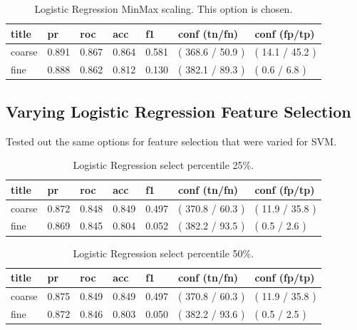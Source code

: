 \documentclass[ms]{nuthesis}
\begin{document}
\FloatBarrier
\begin{table}[H]
\centering
\caption{Logistic Regression MinMax scaling. This option is chosen.}
\label{tab:LogRegMinMax}
\begin{tabular}{|l||l||l||l||l||l||l|}\toprule
title & pr & roc & acc & f1 & conf (tn/fn) & conf (fp/tp) \\ \midrule
coarse & 0.891 & 0.867 & 0.864 & 0.581 & ( 368.6 / 50.9 ) & ( 14.1 / 45.2 ) \\
fine & 0.888 & 0.862 & 0.812 & 0.130 & ( 382.1 / 89.3 ) & ( 0.6 / 6.8 ) \\ \bottomrule
\end{tabular}
\end{table}
\FloatBarrier


\subsection{Varying Logistic Regression Feature Selection}
\par Tested out the same options for feature selection that were varied for SVM.

\FloatBarrier
\begin{table}[H]
\centering
\caption{Logistic Regression select percentile 25\%.}
\label{tab:LogRegSel25}
\begin{tabular}{|l||l||l||l||l||l||l|}\toprule
title & pr & roc & acc & f1 & conf (tn/fn) & conf (fp/tp) \\ \midrule
coarse & 0.872 & 0.848 & 0.849 & 0.497 & ( 370.8 / 60.3 ) & ( 11.9 / 35.8 ) \\
fine & 0.869 & 0.845 & 0.804 & 0.052 & ( 382.2 / 93.5 ) & ( 0.5 / 2.6 ) \\ \bottomrule
\end{tabular}
\end{table}
\FloatBarrier


\FloatBarrier
\begin{table}[H]
\centering
\caption{Logistic Regression select percentile 50\%.}
\label{tab:LogRegSel50}
\begin{tabular}{|l||l||l||l||l||l||l|}\toprule
title & pr & roc & acc & f1 & conf (tn/fn) & conf (fp/tp) \\ \midrule
coarse & 0.875 & 0.849 & 0.849 & 0.497 & ( 370.8 / 60.3 ) & ( 11.9 / 35.8 ) \\
fine & 0.872 & 0.846 & 0.803 & 0.050 & ( 382.2 / 93.6 ) & ( 0.5 / 2.5 ) \\ \bottomrule
\end{tabular}
\end{table}
\FloatBarrier
\end{document}
